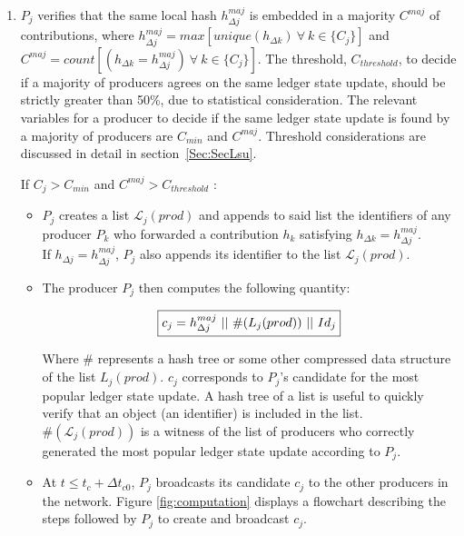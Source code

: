 \begin{enumerate}
\item $P_j$ verifies that the same local hash $h^{maj}_{\Delta j}$ is embedded in a majority $C^{maj}$ of contributions, where $h^{maj}_{\Delta j}= max[unique(h_{\Delta k})~\forall~k\in\{C_j\}]$ and $C^{maj} = count[(h_{\Delta k} = h^{maj}_{\Delta j})~\forall~k\in\{C_j\}]$. The threshold, $C_{threshold}$, to decide if a majority of producers agrees on the same ledger state update, should be strictly greater than 50\%, due to statistical consideration. The relevant variables for a producer to decide if the same ledger state update is found by a majority of producers are $C_{min}$ and $C^{maj}$. Threshold considerations are discussed in detail in section~\ref{Sec:SecLsu}. 

If $C_j > C_{min}$ and $C^{maj} > C_{threshold}$ :

\begin{itemize}
\item $P_j$ creates a list $\mathcal{L}_j(prod)$ and appends to said list the identifiers of any producer $P_k$ who forwarded a contribution $h_k$ satisfying $h_{\Delta k} = h^{maj}_{\Delta j}$.\\
If $h_{\Delta j}= h^{maj}_{\Delta j}$, $P_j$ also appends its identifier to the list $\mathcal{L}_j(prod)$.
\item The producer $P_j$ then computes the following quantity: 

\begin{equation}
\label{eq:cj}
\fbox{$c_j = h^{maj}_{\Delta j}~||~\#(L_j(prod))~||~Id_j$}
\end{equation}

Where \# represents a hash tree or some other compressed data structure of the list $L_j(prod)$. $c_j$ corresponds to $P_j$'s candidate for the most popular ledger state update. A hash tree of a list is useful to quickly verify that an object (an identifier) is included in the list. $\#(\mathcal{L}_j(prod))$ is a witness of the list of producers who correctly generated the most popular ledger state update according to $P_j$. 
\item At $t \leq t_c+\Delta t_{c0}$, $P_j$ broadcasts its candidate $c_j$ to the other producers in the network. Figure \ref{fig:computation} displays a flowchart describing the steps followed by $P_j$ to create and broadcast $c_j$.
\end{itemize}


\end{enumerate}
